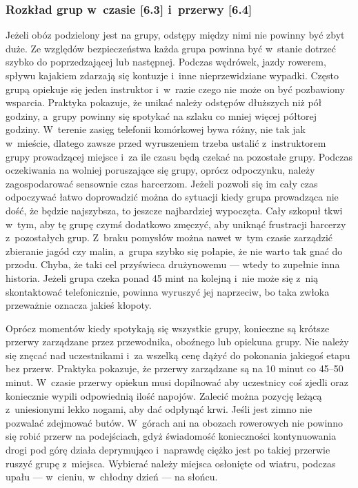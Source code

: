 \documentclass[a5paper,10pt,titlepage,twoside]{article}
\begin{document}
\subsubsection{Rozkład grup w~czasie [6.3] i~przerwy [6.4]}
Jeżeli obóz podzielony jest na grupy, odstępy między nimi nie powinny być zbyt duże. Ze względów bezpieczeństwa każda grupa powinna być w~stanie dotrzeć szybko do poprzedzającej lub następnej. Podczas wędrówek, jazdy rowerem, spływu kajakiem zdarzają się kontuzje i~inne nieprzewidziane wypadki. Często grupą opiekuje się jeden instruktor i~w~razie czego nie może on być pozbawiony wsparcia. Praktyka pokazuje, że unikać należy odstępów dłuższych niż pół godziny, a~grupy powinny się spotykać na szlaku co mniej więcej półtorej godziny. W~terenie zasięg telefonii komórkowej bywa różny, nie tak jak w~mieście, dlatego zawsze przed wyruszeniem trzeba ustalić z~instruktorem grupy prowadzącej miejsce i~za ile czasu będą czekać na pozostałe grupy. Podczas oczekiwania na wolniej poruszające się grupy, oprócz odpoczynku, należy zagospodarować sensownie czas harcerzom. Jeżeli pozwoli się im cały czas odpoczywać łatwo doprowadzić można do sytuacji kiedy grupa prowadząca nie dość, że będzie najszybsza, to jeszcze najbardziej wypoczęta. Cały szkopuł tkwi w~tym, aby tę grupę czymś dodatkowo zmęczyć, aby uniknąć frustracji harcerzy z~pozostałych grup. Z~braku pomysłów można nawet w~tym czasie zarządzić zbieranie jagód czy malin, a~grupa szybko się połapie, że nie warto tak gnać do przodu. Chyba, że taki cel przyświeca drużynowemu --- wtedy to zupełnie inna historia. Jeżeli grupa czeka ponad 45 mint na kolejną i~nie może się z~nią skontaktować telefonicznie, powinna wyruszyć jej naprzeciw, bo taka zwłoka przeważnie oznacza jakieś kłopoty.

Oprócz momentów kiedy spotykają się wszystkie grupy, konieczne są krótsze przerwy zarządzane przez przewodnika, oboźnego lub opiekuna grupy. Nie należy się znęcać nad uczestnikami i~za wszelką cenę dążyć do pokonania jakiegoś etapu bez przerw. Praktyka pokazuje, że przerwy zarządzane są na 10 minut co 45--50 minut. W~czasie przerwy opiekun musi dopilnować aby uczestnicy coś zjedli oraz koniecznie wypili odpowiednią ilość napojów. Zalecić można pozycję leżącą z~uniesionymi lekko nogami, aby dać odpłynąć krwi. Jeśli jest zimno nie pozwalać zdejmować butów. W~górach ani na obozach rowerowych nie powinno się robić przerw na podejściach, gdyż świadomość konieczności kontynuowania drogi pod górę działa deprymująco i~naprawdę ciężko jest po takiej przerwie ruszyć grupę z~miejsca. Wybierać należy miejsca osłonięte od wiatru, podczas upału --- w~cieniu, w~chłodny dzień --- na słońcu.
\end{document}
